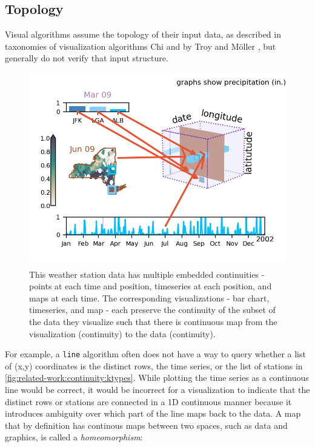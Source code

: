\documentclass[journal]{IEEEtran}
\theoremstyle{definition}
\theoremstyle{remark}
\begin{document}
\subsection{Topology}
\label{sec:related-work:continuity}
Visual algorithms assume the topology of their input data, as described in taxonomies of visualization algorithms Chi\cite{chiTaxonomyVisualizationTechniques2000} and by Troy and M\"{o}ller \cite{toryRethinkingVisualizationHighlevel2004}, but generally do not verify that input structure.


\begin{figure}[]
  \includegraphics[width=1\columnwidth]{k_different_types.png}
  \caption{This weather station data has multiple embedded continuities - points at each time and position, timeseries at each position, and maps at each time. The corresponding visualizations - bar chart, timeseries, and map - each preserve the continuity of the subset of the data they visualize such that there is continuous map from the visualization (continuity) to the data (continuity).}
%
  \label{fig:related-work:continuity:ktypes}
\end{figure}


For example, a \texttt{line} algorithm often does not have a way to query whether a list of (x,y) coordinates is the distinct rows, the time series, or the list of stations in \autoref{fig:related-work:continuity:ktypes}. While plotting the time series as a continuous line would be correct, it would be incorrect for a visualization to indicate that the distinct rows or stations are connected in a 1D continuous manner because it introduces ambiguity over which part of the line maps back to the data. A map that by definition has continous maps between two spaces, such as data and graphics, is called a \textit{homeomorphism}\cite{riehlCategoryTheoryContext}:
\end{document}
